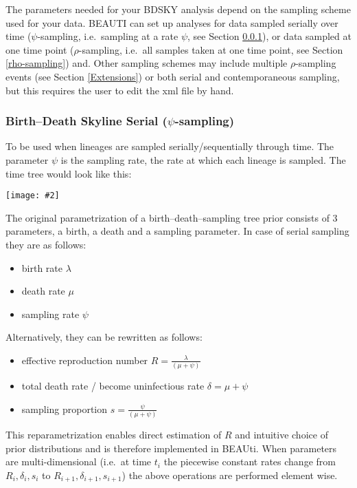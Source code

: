 \documentclass[11pt]{article}
\newcommand{\includeimage}[2][]{%
\texttt{[image: \#2]}
}
\begin{document}
The parameters needed for your BDSKY analysis depend on the sampling scheme used for your data. BEAUTI can set up analyses for data sampled serially over time ($\psi$-sampling, i.e.~sampling at a rate $\psi$, see Section \ref{psi-sampling}), or data sampled at one time point ($\rho$-sampling, i.e.~all samples taken at one time point, see Section \ref{rho-sampling}) and. Other sampling schemes may include multiple $\rho$-sampling events (see Section \ref{Extensions}) or both serial and contemporaneous sampling, but this requires the user to edit the xml file by hand.


\subsubsection{Birth--Death Skyline Serial ($\psi$-sampling)}
\label{psi-sampling}
To be used when lineages are sampled serially/sequentially through time. The parameter $\psi$ is the sampling rate, the rate at which each lineage is sampled. The time tree would look like this:
\begin{center}
\includeimage[width=.4\linewidth]{figures/figure_serial_tree}
\end{center}

The original parametrization of a birth--death--sampling tree prior consists of 3 parameters, a birth, a death and a sampling parameter. In case of serial sampling they are as follows: 

\begin{itemize}
\item birth rate $\lambda$
\item death rate $\mu$
\item sampling rate $\psi$
\end{itemize}

Alternatively, they can be rewritten as follows:

\begin{itemize}
\item effective reproduction number $R = \frac{\lambda}{(\mu + \psi)}$
\item total death rate / become uninfectious rate $\delta = \mu + \psi$
\item sampling proportion $s = \frac{\psi }{ (\mu + \psi)}$
\end{itemize}

This reparametrization enables direct estimation of $R$ and intuitive choice of prior distributions and is therefore implemented in BEAUti.
When parameters are multi-dimensional (i.e.~at time $t_i$ the piecewise constant rates change from $R_i, \delta_i, s_i$ to $R_{i+1}, \delta_{i+1}, s_{i+1}$) the above operations are performed element wise. \\
\end{document}
